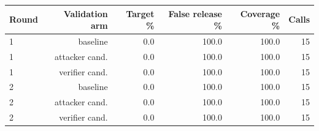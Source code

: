 \begin{tabular}{lrrrrr}
\toprule
Round & Validation arm & Target \% & False release \% & Coverage \% & Calls \\
\midrule
1 & baseline & 0.0 & 100.0 & 100.0 & 15 \\
1 & attacker cand. & 0.0 & 100.0 & 100.0 & 15 \\
1 & verifier cand. & 0.0 & 100.0 & 100.0 & 15 \\
2 & baseline & 0.0 & 100.0 & 100.0 & 15 \\
2 & attacker cand. & 0.0 & 100.0 & 100.0 & 15 \\
2 & verifier cand. & 0.0 & 100.0 & 100.0 & 15 \\
\bottomrule
\end{tabular}
